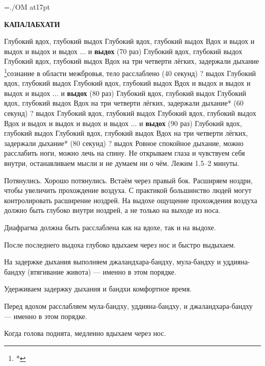 \nopagenumbers
\font\OM=./OM at17pt
\parindent=0pt
\parskip=7pt
\centerline{\bf КАПАЛАБХАТИ}
\begingroup
\obeylines
Глубокий вдох, глубокий выдох
Глубокий вдох, глубокий выдох
Вдох и выдох и выдох и выдох и выдох $\ldots$ и {\bf выдох} (70 раз)
Глубокий вдох, глубокий выдох
Глубокий вдох, глубокий выдох
Вдох на три четверти лёгких, задержали дыхание%
  \footnote{*}{сознание в области межбровья, тело расслаблено} (40 секунд)
{\OM?} выдох
Глубокий вдох, глубокий выдох
Глубокий вдох, глубокий выдох
Вдох и выдох и выдох и выдох и выдох $\ldots$ и {\bf выдох} (80 раз)
Глубокий вдох, глубокий выдох
Глубокий вдох, глубокий выдох
Вдох на три четверти лёгких, задержали дыхание* (60 секунд)
{\OM?} выдох
Глубокий вдох, глубокий выдох
Глубокий вдох, глубокий выдох
Вдох и выдох и выдох и выдох и выдох $\ldots$ и {\bf выдох} (90 раз)
Глубокий вдох, глубокий выдох
Глубокий вдох, глубокий выдох
Вдох на три четверти лёгких, задержали дыхание* (80 секунд)
{\OM?} выдох
\endgroup
Ровное спокойное дыхание, можно расслабить ноги, можно лечь на спину.
Не открываем глаза и чувствуем себя внутри, останавливаем мысли и не думаем ни о чём.
Лежим 1.5--2 минуты. \par
Потянулись. Хорошо потянулись. Встаём через правый бок.
\vfil\eject
\parskip=0pt
Расширяем ноздри, чтобы увеличить прохождение воздуха. С практикой большинство людей могут
контролировать расширение ноздрей. На выдохе ощущение прохождения воздуха должно быть глубоко
внутри ноздрей, а не только на выходе из носа.

Диафрагма должна быть расслаблена как на вдохе, так и на выдохе.

После последнего выдоха глубоко вдыхаем через нос и быстро выдыхаем.

На задержке дыхания выполняем джаландхара-бандху, мула-бандху и уддияна-бандху
(втягивание живота) --- именно в этом порядке.

Удерживаем задержку дыхания и бандхи комфортное время.

Перед вдохом расслабляем мула-бандху, уддияна-бандху, и джаландха\-ра-бандху --- именно в
этом порядке.

Когда голова поднята, медленно вдыхаем через нос.

\bye
